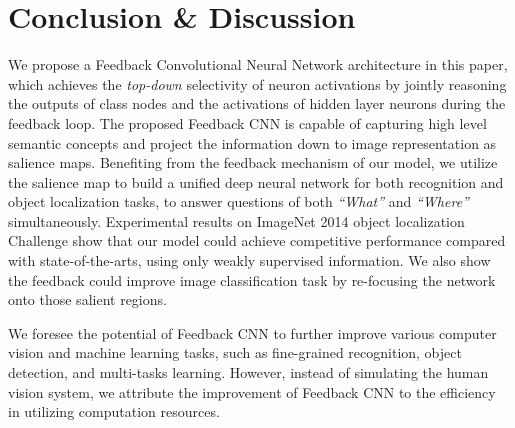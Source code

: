 \section{Conclusion \& Discussion}
\label{sec:conclusion}

We propose a Feedback Convolutional Neural Network architecture in this paper, which achieves the \emph{top-down} selectivity of neuron activations by jointly reasoning the outputs of class nodes and the activations of hidden layer neurons during the feedback loop. The proposed Feedback CNN is capable of capturing high level semantic concepts and project the information down to image representation as salience maps. Benefiting from the feedback mechanism of our model, we utilize the salience map to build a unified deep neural network for both recognition and object localization tasks, to answer questions of both \emph{``What''} and \emph{``Where''} simultaneously. Experimental results on ImageNet 2014 object localization Challenge show that our model could achieve competitive performance compared with state-of-the-arts, using only weakly supervised information. We also show the feedback could improve image classification task by re-focusing the network onto those salient regions.

We foresee the potential of Feedback CNN to further improve various computer vision and machine learning tasks, such as fine-grained recognition, object detection, and multi-tasks learning. However, instead of simulating the human vision system, we attribute the improvement of Feedback CNN to the efficiency in utilizing computation resources.
